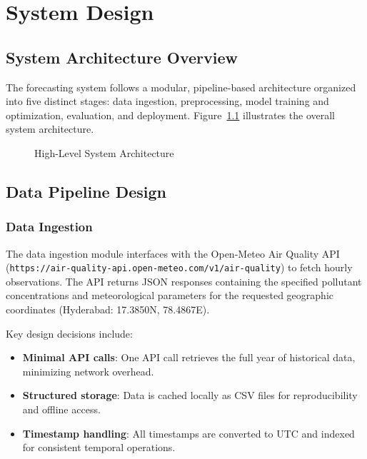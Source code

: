\chapter{System Design}

\section{System Architecture Overview}

The forecasting system follows a modular, pipeline-based architecture organized into five distinct stages: data ingestion, preprocessing, model training and optimization, evaluation, and deployment. Figure~\ref{fig:arch_overview} illustrates the overall system architecture.

\begin{figure}[H]
\centering
{}
\caption{High-Level System Architecture}
\label{fig:arch_overview}
\end{figure}

\section{Data Pipeline Design}

\subsection{Data Ingestion}

The data ingestion module interfaces with the Open-Meteo Air Quality API (\texttt{https://air-quality-api.open-meteo.com/v1/air-quality}) to fetch hourly observations. The API returns JSON responses containing the specified pollutant concentrations and meteorological parameters for the requested geographic coordinates (Hyderabad: 17.3850\textdegree N, 78.4867\textdegree E).

Key design decisions include:
\begin{itemize}
    \item \textbf{Minimal API calls}: One API call retrieves the full year of historical data, minimizing network overhead.
    \item \textbf{Structured storage}: Data is cached locally as CSV files for reproducibility and offline access.
    \item \textbf{Timestamp handling}: All timestamps are converted to UTC and indexed for consistent temporal operations.
\end{itemize}

